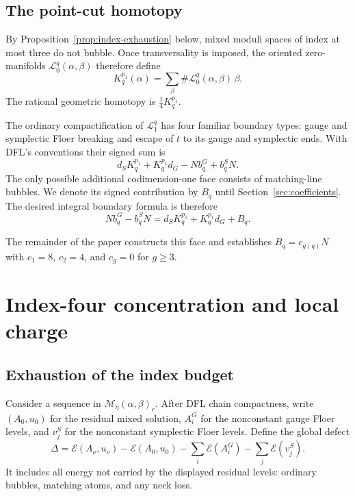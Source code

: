 \documentclass[11pt]{amsart}
\theoremstyle{definition}
\theoremstyle{remark}
\theoremstyle{plain}
\newcommand{\cE}{\mathcal{E}}
\newcommand{\cL}{\mathcal{L}}
\newcommand{\cM}{\mathcal{M}}
\begin{document}
\subsection{The point-cut homotopy}\label{sec:candidate-homotopy}
By Proposition~\ref{prop:index-exhaustion} below, mixed moduli spaces of
index at most three do not bubble.  Once transversality is imposed, the
oriented zero-manifolds $\cL_0^q(\alpha,\beta)$ therefore define
\begin{equation}\label{eq:K-integral}
 K_q^{p_1}(\alpha)
 =\sum_\beta\#\cL_0^q(\alpha,\beta)\,\beta.
\end{equation}
The rational geometric homotopy is $\frac14K_q^{p_1}$.

The ordinary compactification of $\cL_1^q$ has four familiar boundary
types: gauge and symplectic Floer breaking and escape of $t$ to its gauge
and symplectic ends.  With DFL's conventions their signed sum is
\begin{equation}\label{eq:ordinary-boundary}
 d_SK_q^{p_1}+K_q^{p_1}d_G
 -Nb_q^G+b_q^SN.
\end{equation}
The only possible additional codimension-one face consists of
matching-line bubbles.  We denote its signed contribution by $B_q$ until
Section~\ref{sec:coefficients}.  The desired integral boundary formula is
therefore
\begin{equation}\label{eq:boundary-with-B}
 Nb_q^G-b_q^SN
 =d_SK_q^{p_1}+K_q^{p_1}d_G+B_q.
\end{equation}

The remainder of the paper constructs this face and establishes
$B_q=c_{g(q)}N$ with $c_1=8$, $c_2=4$, and $c_g=0$ for $g\geq3$.

\section{Index-four concentration and local charge}
\label{sec:charge}

\subsection{Exhaustion of the index budget}\label{sec:index-exhaustion}
Consider a sequence in $\cM_\eta(\alpha,\beta)_r$.  After DFL chain
compactness, write $(A_0,u_0)$ for the residual mixed solution,
$A_i^G$ for the nonconstant gauge Floer levels, and $v_j^S$ for the
nonconstant symplectic Floer levels.  Define the global defect
\begin{equation}\label{eq:global-defect}
 \Delta=\cE(A_\nu,u_\nu)-\cE(A_0,u_0)
        -\sum_i\cE(A_i^G)-\sum_j\cE(v_j^S).
\end{equation}
It includes all energy not carried by the displayed residual levels:
ordinary bubbles, matching atoms, and any neck loss.
\end{document}
